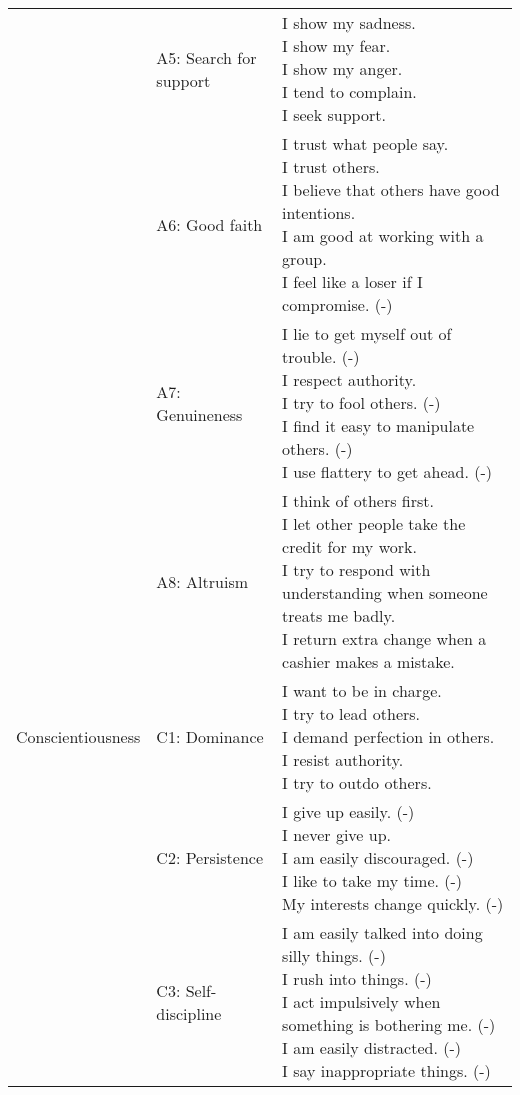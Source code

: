 \begin{appendix}
\begin{longtable}[t]{lll}
\addlinespace
 & A5: Search for support & \makecell[l]{I show my sadness.\\I show my fear.\\I show my anger.\\I tend to complain.\\I seek support.}\\
\addlinespace
 & A6: Good faith & \makecell[l]{I trust what people say.\\I trust others.\\I believe that others have good intentions.\\I am good at working with a group.\\I feel like a loser if I compromise. (-)}\\
\addlinespace
 & A7: Genuineness & \makecell[l]{I lie to get myself out of trouble. (-)\\I respect authority.\\I try to fool others. (-)\\I find it easy to manipulate others. (-)\\I use flattery to get ahead. (-)}\\
\addlinespace
 & A8: Altruism & \makecell[l]{I think of others first.\\I let other people take the credit for my work.\\I try to respond with understanding when someone treats me badly.\\I return extra change when a cashier makes a mistake.}\\
\addlinespace
Conscientiousness & C1: Dominance & \makecell[l]{I want to be in charge.\\I try to lead others.\\I demand perfection in others.\\I resist authority.\\I try to outdo others.}\\
\addlinespace
 & C2: Persistence & \makecell[l]{I give up easily. (-)\\I never give up.\\I am easily discouraged. (-)\\I like to take my time. (-)\\My interests change quickly. (-)}\\
\addlinespace
 & C3: Self-discipline & \makecell[l]{I am easily talked into doing silly things. (-)\\I rush into things. (-)\\I act impulsively when something is bothering me. (-)\\I am easily distracted. (-)\\I say inappropriate things. (-)}\\

\end{longtable}
\end{appendix}
